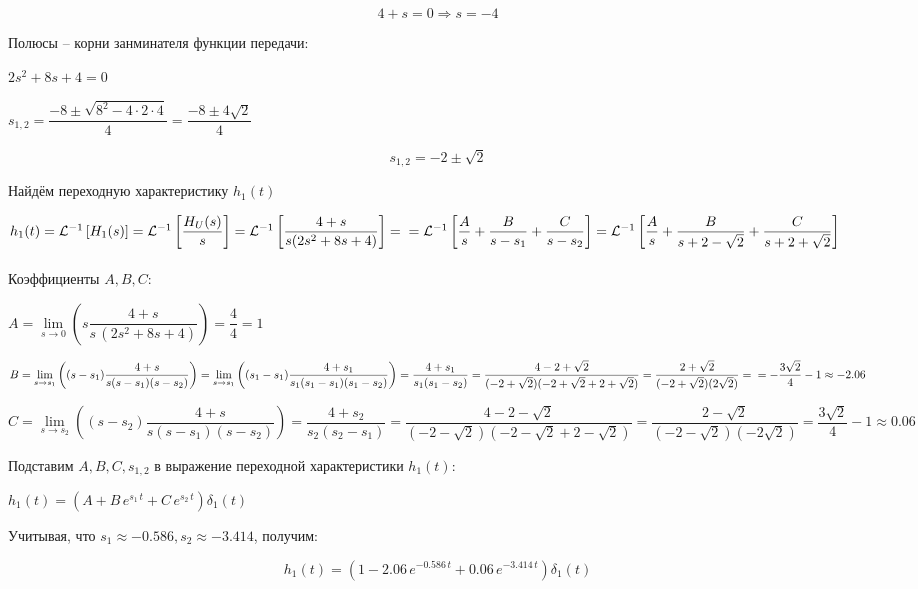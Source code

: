 $$ 4 + s = 0 \Rightarrow s = -4 $$

Полюсы -- корни занминателя функции передачи:

$ 2s^2 + 8s + 4 = 0 $

$ 
s_{1,2} = 
\dfrac{-8 \pm \sqrt{8^2 - 4 \cdot 2 \cdot 4}}{4} =
\dfrac{-8 \pm 4\sqrt{2}}{4}
$

$$
    s_{1,2} = -2 \pm \sqrt{2}
$$

Найдём переходную характеристику $ h_1(t) $

\newcommand{\lag}[1]{
    \mathcal{L}^{-1}\left[ 
        #1
    \right]
}

\newcommand{\mylim}[3][x]{
    \lim\limits_{#1 \rightarrow #2}
    \left( #3 \right)
}

$ h_1(t) = 
\lag{H_1(s)} =
\lag{\dfrac{H_U(s)}{s}} = 
\lag{\dfrac{4 + s}{s(2s^2 + 8s + 4)}} =\\\\=
\lag{
    \dfrac{A}{s} + 
    \dfrac{B}{s-s_1} + 
    \dfrac{C}{s-s_2}
}
=
\lag{
    \dfrac{A}{s} + 
    \dfrac{B}{s + 2 - \sqrt{2}} + 
    \dfrac{C}{s + 2 + \sqrt{2}}
}
$\\\\

Коэффициенты $ A, B, C $:

$ 
A = 
\mylim[s]{0}{s \dfrac{4 + s}{s\,(2s^2 + 8s + 4)}} = 
\dfrac{4}{4} = 1
$

$ 
B = 
\mylim[s]{s_1}{(s-s_1) \dfrac{4 + s}{s(s - s_1)(s - s_2)}} = 
\mylim[s]{s_1}{(s_1-s_1) \dfrac{4 + s_1}{s_1(s_1 - s_1)(s_1 - s_2)}} = 
\dfrac{4 + s_1}{s_1(s_1 - s_2)} = 
\dfrac{4 - 2 + \sqrt{2}}{(-2 + \sqrt{2})(-2 + \sqrt{2} + 2 + \sqrt{2})}
=
\dfrac{2 + \sqrt{2}}{(-2 + \sqrt{2})(2\sqrt{2})} 
=\\\\=
- \dfrac{3\sqrt{2}}{4} - 1 \approx -2.06
$

$ 
C = 
\mylim[s]{s_2}{(s-s_2) \dfrac{4 + s}{s(s - s_1)(s - s_2)}} =
\dfrac{4 + s_2}{s_2(s_2 - s_1)} =
\dfrac{4 - 2 - \sqrt{2}}{(-2 - \sqrt{2})(-2 - \sqrt{2} + 2 - \sqrt{2})}
=
\dfrac{2 - \sqrt{2}}{(-2 - \sqrt{2})(- 2\sqrt{2})}
=
\dfrac{3\sqrt{2}}{4} - 1 \approx 0.06
$

Подставим $ A, B, C, s_{1,2} $ 
в выражение переходной характеристики 
$ h_1(t) $:

$ h_1(t) = (A + B\,e^{s_1\,t} + C\,e^{s_2\,t})\delta_1(t) $

Учитывая, 
что $ s_1 \approx -0.586, s_2 \approx -3.414 $,
получим:

\begin{equation}\label{eq:h_1_t_2}
    h_1(t) = (
        1
        - 2.06\,e^{-0.586\,t} 
        + 0.06\,e^{-3.414\,t}
    )\delta_1(t)
\end{equation}

